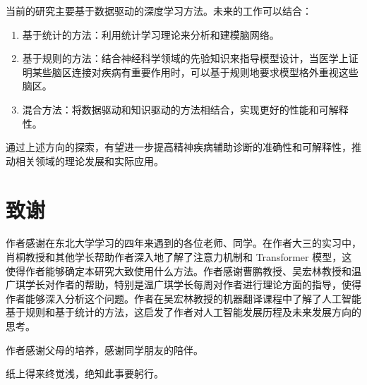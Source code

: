 \documentclass[12pt,a4paper]{article}
\begin{document}
当前的研究主要基于数据驱动的深度学习方法。未来的工作可以结合：

\begin{enumerate}
\item 基于统计的方法：利用统计学习理论来分析和建模脑网络。
\item 基于规则的方法：结合神经科学领域的先验知识来指导模型设计，当医学上证明某些脑区连接对疾病有重要作用时，可以基于规则地要求模型格外重视这些脑区。
\item 混合方法：将数据驱动和知识驱动的方法相结合，实现更好的性能和可解释性。
\end{enumerate}

通过上述方向的探索，有望进一步提高精神疾病辅助诊断的准确性和可解释性，推动相关领域的理论发展和实际应用。




\section*{致谢}

作者感谢在东北大学学习的四年来遇到的各位老师、同学。在作者大三的实习中，肖桐教授和其他学长帮助作者深入地了解了注意力机制和 Transformer 模型，这使得作者能够确定本研究大致使用什么方法。作者感谢曹鹏教授、吴宏林教授和温广琪学长对作者的帮助，特别是温广琪学长每周对作者进行理论方面的指导，使得作者能够深入分析这个问题。作者在吴宏林教授的机器翻译课程中了解了人工智能基于规则和基于统计的方法，这启发了作者对人工智能发展历程及未来发展方向的思考。

作者感谢父母的培养，感谢同学朋友的陪伴。

纸上得来终觉浅，绝知此事要躬行。
\end{document}
